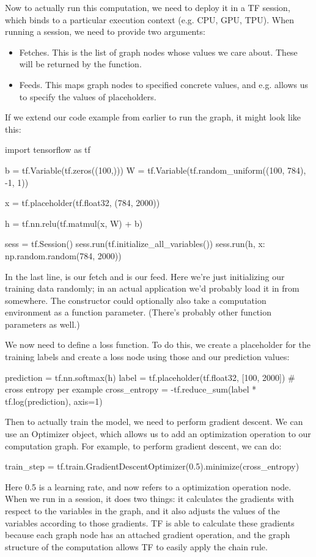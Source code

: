 Now to actually run this computation, we need to deploy it in a TF session, which binds to a particular execution context (e.g. CPU, GPU, TPU). When running a session, we need to provide two arguments:
\begin{itemize}
\item Fetches. This is the list of graph nodes whose values we care about. These will be returned by the  function.
\item Feeds. This maps graph nodes to specified concrete values, and e.g. allows us to specify the values of placeholders.
\end{itemize}
If we extend our code example from earlier to run the graph, it might look like this:
\begin{python}
import tensorflow as tf

b = tf.Variable(tf.zeros((100,)))
W = tf.Variable(tf.random_uniform((100, 784), -1, 1))

x = tf.placeholder(tf.float32, (784, 2000))

h = tf.nn.relu(tf.matmul(x, W) + b)

sess = tf.Session()
sess.run(tf.initialize_all_variables())
sess.run(h, {x: np.random.random(784, 2000)})
\end{python}
In the last line,  is our fetch and  is our feed. Here we're just initializing our training data randomly; in an actual application we'd probably load it in from somewhere. The  constructor could optionally also take a computation environment as a function parameter. (There's probably other function parameters as well.)

We now need to define a loss function. To do this, we create a placeholder for the training labels and create a loss node using those and our prediction values:
\begin{python}
prediction = tf.nn.softmax(h)
label = tf.placeholder(tf.float32, [100, 2000])
# cross entropy per example
cross_entropy = -tf.reduce_sum(label * tf.log(prediction), axis=1)
\end{python}
Then to actually train the model, we need to perform gradient descent. We can use an Optimizer object, which allows us to add an optimization operation to our computation graph. For example, to perform gradient descent, we can do:
\begin{python}
train_step = tf.train.GradientDescentOptimizer(0.5).minimize(cross_entropy)
\end{python}
Here 0.5 is a learning rate, and  now refers to a optimization operation node. When we run  in a session, it does two things: it calculates the gradients with respect to the variables in the graph, and it also adjusts the values of the variables according to those gradients. TF is able to calculate these gradients because each graph node has an attached gradient operation, and the graph structure of the computation allows TF to easily apply the chain rule.

